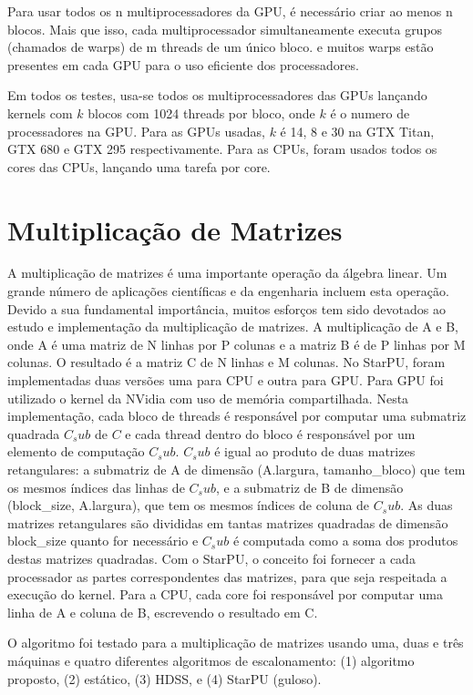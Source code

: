 Para usar todos os n multiprocessadores da GPU, é necessário criar ao menos n blocos. Mais que isso, cada multiprocessador simultaneamente executa grupos (chamados de warps) de m threads de um único bloco. e muitos warps estão presentes em cada GPU para o uso eficiente dos processadores.

Em todos os testes, usa-se todos os multiprocessadores das GPUs lançando kernels com $k$ blocos com 1024 threads por bloco, onde $k$ é o numero de processadores na GPU. Para as GPUs usadas, $k$ é 14, 8 e 30 na GTX Titan, GTX 680 e GTX 295 respectivamente. Para as CPUs, foram usados todos os cores das CPUs, lançando uma tarefa por core.

\section{Multiplicação de Matrizes}

A multiplicação de matrizes é uma importante operação da álgebra linear. Um grande número de aplicações científicas e da engenharia incluem esta operação. Devido a sua fundamental importância, muitos esforços tem sido devotados ao estudo e implementação da multiplicação de matrizes. A multiplicação de A e B, onde A é uma matriz de N linhas por P colunas e a matriz B é de P linhas por M colunas. O resultado é a matriz C de N linhas e M colunas. No StarPU, foram implementadas duas versões uma para CPU e outra para GPU. Para GPU foi utilizado o kernel da NVidia com uso de memória compartilhada.  Nesta implementação, cada bloco de threads é responsável por computar uma submatriz quadrada $C_sub$ de $C$ e cada thread dentro do bloco é responsável por um elemento de computação $C_sub$. $C_sub$ é igual ao produto de duas matrizes retangulares: a submatriz de A de dimensão (A.largura, tamanho\_bloco) que tem os mesmos índices das linhas de $C_sub$, e a submatriz de B de dimensão (block\_size, A.largura), que tem os mesmos índices de coluna de $C_sub$. As duas matrizes retangulares são divididas em tantas matrizes quadradas de dimensão block\_size quanto for necessário e $C_sub$ é computada como a soma dos produtos destas matrizes quadradas. Com o StarPU, o conceito foi fornecer a cada processador as partes correspondentes das matrizes, para que seja respeitada a execução do kernel. Para a CPU, cada core foi responsável por computar uma linha de A e coluna de B, escrevendo o resultado em C.

O algoritmo foi testado para a multiplicação de matrizes usando uma, duas e três máquinas e quatro diferentes algoritmos de escalonamento: (1) algoritmo proposto, (2) estático, (3) HDSS, e (4) StarPU (guloso).

